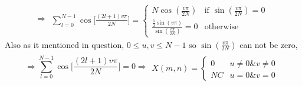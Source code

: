 \documentclass[fleqn]{article}
\begin{document}
\begin{question}
{\[ \Rightarrow  \begin{split} \\
	\sum_{l=0}^{N-1}\cos\big[\frac{(2l+1)v\pi}{2N} \big] =
	\begin{cases}
	N \cos \left( \frac{v\pi}{2N} \right) & \text{if } \sin\left(\frac{v\pi}{2N}\right) = 0 \\
	\frac{\frac{1}{2}\sin(v\pi)}{\sin(\frac{v\pi}{2N}) } =0 & \text{otherwise}
	\end{cases}
\end{split} \]
Also as it mentioned in question, $ 0\le u,v\le N-1$ so $\sin\left(\frac{v\pi}{2N}\right)$ can not be zero,
\[\Rightarrow \sum_{l=0}^{N-1}\cos\big[\frac{(2l+1)v\pi}{2N} \big] = 0
\Rightarrow\boxed{  \begin{split} \\
	X(m,n) =
	\begin{cases}
	0 & u \neq 0 \& v\neq 0 \\
	NC & u=0 \& v=0
	\end{cases}
\end{split}} \]

}

\end{question}


\begin{question}


\end{question}

\end{document}
